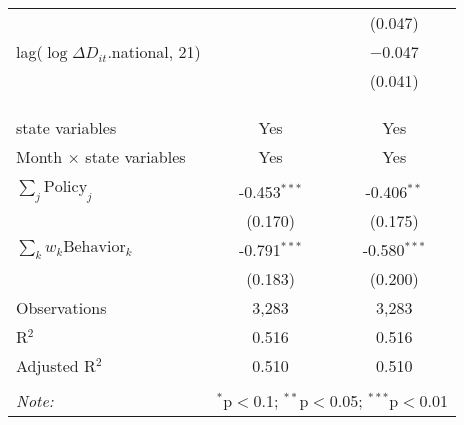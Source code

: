 \begin{tabular}{@{\extracolsep{1pt}}lcc}
  &  & (0.047) \\ 
  lag($\log \Delta D_{it}$.national, 21) &  & $-$0.047 \\ 
  &  & (0.041) \\ 
   &  &  \\ 
  &  &  \\ 
 \hline \\[-1.8ex] 
state variables & Yes & Yes \\ 
Month $\times$ state variables & Yes & Yes \\ 
\hline \\[-1.8ex] 
$\sum_j \mathrm{Policy}_j$ & -0.453$^{***}$ & -0.406$^{**}$ \\ 
 & (0.170) & (0.175) \\ 
$\sum_k w_k \mathrm{Behavior}_k$ & -0.791$^{***}$ & -0.580$^{***}$ \\ 
 & (0.183) & (0.200) \\ 
Observations & 3,283 & 3,283 \\ 
R$^{2}$ & 0.516 & 0.516 \\ 
Adjusted R$^{2}$ & 0.510 & 0.510 \\ 
\hline 
\hline \\[-1.8ex] 
\textit{Note:}  & \multicolumn{2}{r}{$^{*}$p$<$0.1; $^{**}$p$<$0.05; $^{***}$p$<$0.01} \\ 
\end{tabular} 